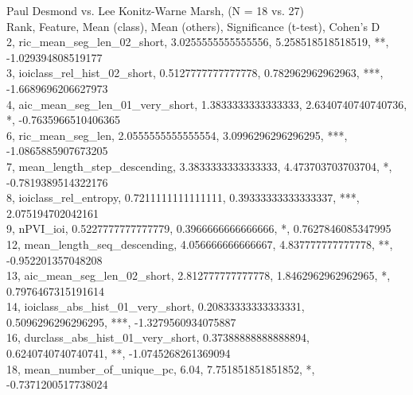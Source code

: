 Paul Desmond vs. Lee Konitz-Warne Marsh, (N = 18 vs. 27)\\
Rank, Feature, Mean (class), Mean (others), Significance (t-test), Cohen's D\\
2, ric_mean_seg_len_02_short, 3.0255555555555556, 5.258518518518519, **, -1.029394808519177\\
3, ioiclass_rel_hist_02_short, 0.5127777777777778, 0.782962962962963, ***, -1.6689696206627973\\
4, aic_mean_seg_len_01_very_short, 1.3833333333333333, 2.6340740740740736, *, -0.7635966510406365\\
6, ric_mean_seg_len, 2.0555555555555554, 3.0996296296296295, ***, -1.0865885907673205\\
7, mean_length_step_descending, 3.3833333333333333, 4.473703703703704, *, -0.7819389514322176\\
8, ioiclass_rel_entropy, 0.7211111111111111, 0.39333333333333337, ***, 2.075194702042161\\
9, nPVI_ioi, 0.5227777777777779, 0.3966666666666666, *, 0.7627846085347995\\
12, mean_length_seq_descending, 4.056666666666667, 4.837777777777778, **, -0.952201357048208\\
13, aic_mean_seg_len_02_short, 2.812777777777778, 1.8462962962962965, *, 0.7976467315191614\\
14, ioiclass_abs_hist_01_very_short, 0.20833333333333331, 0.5096296296296295, ***, -1.3279560934075887\\
16, durclass_abs_hist_01_very_short, 0.37388888888888894, 0.6240740740740741, **, -1.0745268261369094\\
18, mean_number_of_unique_pc, 6.04, 7.751851851851852, *, -0.7371200517738024\\
